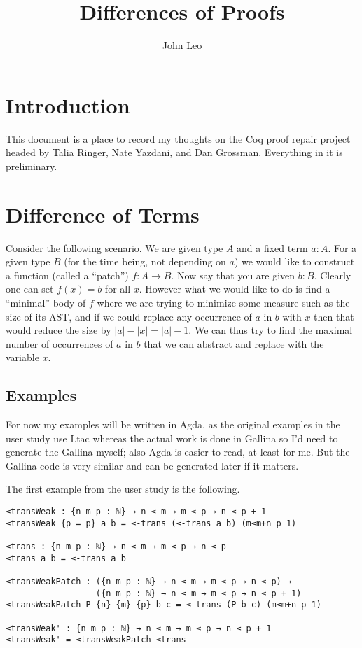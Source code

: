 \documentclass{article}
\begin{document}
\title{Differences of Proofs}
\author{John Leo}
\maketitle

\section{Introduction}

This document is a place to record my thoughts on the Coq proof
repair project headed by Talia Ringer, Nate Yazdani, and Dan
Grossman.  Everything in it is preliminary.

\section{Difference of Terms}

Consider the following scenario.  We are given type $A$ and a fixed
term $a : A$.  For a given type $B$ (for the time being, not depending
on $a$) we would like to construct a function (called a ``patch'') $f
: A \to B$. Now say that you are given $b : B$. Clearly one can set
$f(x) = b$ for all $x$.  However what we would like to do is find a
``minimal'' body of $f$ where we are trying to minimize some measure
such as the size of its AST, and if we could replace any occurrence of
$a$ in $b$ with $x$ then that would reduce the size by $|a| - |x| =
|a| - 1$.  We can thus try to find the maximal number of occurrences
of $a$ in $b$ that we can abstract and replace with the
variable $x$.

\subsection{Examples}

For now my examples will be written in Agda, as the original examples
in the user study use Ltac whereas the actual work is done in Gallina
so I'd need to generate the Gallina myself; also Agda is easier to
read, at least for me.  But the Gallina code is very similar and can
be generated later if it matters.

The first example from the user study is the following.

\begin{verbatim}
≤transWeak : {n m p : ℕ} → n ≤ m → m ≤ p → n ≤ p + 1
≤transWeak {p = p} a b = ≤-trans (≤-trans a b) (m≤m+n p 1)

≤trans : {n m p : ℕ} → n ≤ m → m ≤ p → n ≤ p
≤trans a b = ≤-trans a b

≤transWeakPatch : ({n m p : ℕ} → n ≤ m → m ≤ p → n ≤ p) →
                  ({n m p : ℕ} → n ≤ m → m ≤ p → n ≤ p + 1)
≤transWeakPatch P {n} {m} {p} b c = ≤-trans (P b c) (m≤m+n p 1)

≤transWeak' : {n m p : ℕ} → n ≤ m → m ≤ p → n ≤ p + 1
≤transWeak' = ≤transWeakPatch ≤trans
\end{verbatim}
\end{document}
